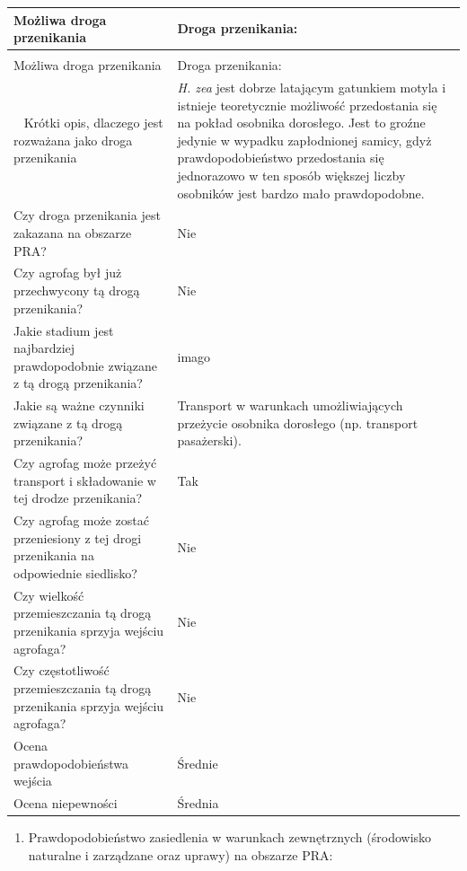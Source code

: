 \documentclass[polish,a4paper]{article}
\providecommand{\tightlist}{%
  \setlength{\itemsep}{0pt}\setlength{\parskip}{0pt}}
\begin{document}
\begin{longtabu} to 
\toprule
{}  \textbf{Możliwa droga przenikania} & \textbf{Droga przenikania:}\\
\midrule
\endfirsthead
{}\\
\toprule
Możliwa droga przenikania & Droga przenikania:\\
\midrule
\endhead
\
\endfoot
\bottomrule
\endlastfoot
Krótki opis, dlaczego jest rozważana jako droga przenikania & \textit{H. zea} jest dobrze latającym gatunkiem motyla i istnieje teoretycznie możliwość przedostania się na pokład osobnika dorosłego. Jest to groźne jedynie w wypadku zapłodnionej samicy, gdyż prawdopodobieństwo przedostania się jednorazowo w ten sposób większej liczby osobników jest bardzo mało prawdopodobne.\\
Czy droga przenikania jest zakazana na obszarze PRA? & Nie\\
Czy agrofag był już przechwycony tą drogą przenikania? & Nie\\
Jakie stadium jest najbardziej prawdopodobnie związane z tą drogą przenikania? & imago\\
Jakie są ważne czynniki związane z tą drogą przenikania? & Transport w warunkach umożliwiających przeżycie osobnika dorosłego (np. transport pasażerski).\\
Czy agrofag może przeżyć transport i składowanie w tej drodze przenikania? & Tak\\
Czy agrofag może zostać przeniesiony z tej drogi przenikania na odpowiednie siedlisko? & Nie\\
Czy wielkość przemieszczania tą drogą przenikania sprzyja wejściu agrofaga? & Nie\\
Czy częstotliwość przemieszczania tą drogą przenikania sprzyja wejściu agrofaga? & Nie\\
Ocena prawdopodobieństwa wejścia & Średnie\\
\cmidrule{1-2}
Ocena niepewności & Średnia\\*
\end{longtabu}

\begin{enumerate}
\def\labelenumi{(\arabic{enumi})}
\setcounter{enumi}{8}
\tightlist
\item
  Prawdopodobieństwo zasiedlenia w warunkach zewnętrznych (środowisko
  naturalne i zarządzane oraz uprawy) na obszarze PRA:
\end{enumerate}
\end{document}
